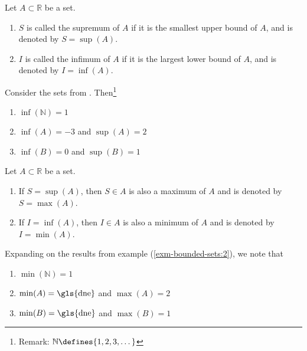 \begin{definition}\label{def-supremum-infimum-sets}
    Let $A\subset\mathbb{R}$ be a set.
    \begin{enumerate}
        \item $S$ is called the supremum of $A$ if it is the smallest upper bound 
        of $A$, and is denoted by $S=\sup(A)$.
        \item $I$ is called the infimum of $A$ if it is the largest lower bound 
        of $A$, and is denoted by $I=\inf(A)$.
    \end{enumerate}
\end{definition}

\begin{exm}\label{exm-bounded-sets:2}
    Consider the sets from . Then\footnote{Remark:
    $\mathbb{N}\defines\{1,2,3,\dots\}$}
    \begin{enumerate}
        \item $\inf(\mathbb{N})=1$
        \item $\inf(A)=-3$ and $\sup(A)=2$
        \item $\inf(B)=0$ and $\sup(B)=1$
    \end{enumerate}
\end{exm}

\begin{definition}\label{def-maximum-minimum}
    Let $A\subset\mathbb{R}$ be a set.
    \begin{enumerate}
        \item If $S=\sup(A)$, then $S\in A$ is also a maximum of $A$ and is denoted by $S=\max(A)$.
        \item If $I=\inf(A)$, then $I\in A$ is also a minimum of $A$ and is denoted by $I=\min(A)$.
    \end{enumerate}
\end{definition}

\begin{exm}\label{exm-bounded-sets:3}
    Expanding on the results from example (\ref{exm-bounded-sets:2}), we note that
    \begin{enumerate}
        \item $\min(\mathbb{N})=1$
        \item $\min(A)=\text{\gls{dne}}$ and $\max(A)=2$
        \item $\min(B)=\text{\gls{dne}}$ and $\max(B)=1$
    \end{enumerate}
\end{exm}
